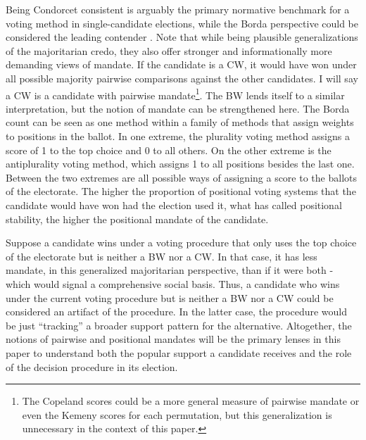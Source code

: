 \documentclass[hidelinks,11pt]{article}
\begin{document}
Being Condorcet consistent is arguably the primary normative benchmark for a
voting method in single-candidate elections, while the Borda perspective could
be considered the leading contender \parencite{regenwetter2006behavioral,
felsenthal2011review, nurmi2002voting}. Note that while being plausible
generalizations of the majoritarian credo, they also offer stronger and
informationally more demanding views of mandate. If the candidate is a CW, it
would have won under all possible majority pairwise comparisons against the
other candidates. I will say a CW is a candidate with pairwise
mandate\footnote{The Copeland scores could be a more general measure of pairwise
mandate or even the Kemeny scores for each permutation, but this generalization
is unnecessary in the context of this paper.}. The BW lends itself to a similar
interpretation, but the notion of mandate can be strengthened here. The Borda
count can be seen as one method within a family of methods that assign weights
to positions in the ballot. In one extreme, the plurality voting method assigns
a score of 1 to the top choice and 0 to all others. On the other extreme is the
antiplurality voting method, which assigns 1 to all positions besides the last
one. Between the two extremes are all possible ways of assigning a score to the
ballots of the electorate. The higher the proportion of positional voting
systems that the candidate would have won had the election used it, what
\textcite{tabarrok2001president} has called positional stability, the higher the
positional mandate of the candidate.

Suppose a candidate wins under a voting procedure that only uses the top choice
of the electorate but is neither a BW nor a CW. In that case, it has less
mandate, in this generalized majoritarian perspective, than if it were both -
which would signal a comprehensive social basis. Thus, a candidate who wins
under the current voting procedure but is neither a BW nor a CW could be
considered an artifact of the procedure. In the latter case, the procedure would
be just ``tracking'' a broader support pattern for the alternative. Altogether,
the notions of pairwise and positional mandates will be the primary lenses in
this paper to understand both the popular support a candidate receives and the
role of the decision procedure in its election.
\end{document}
